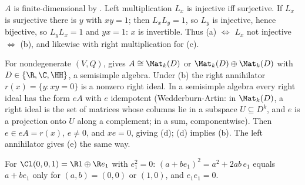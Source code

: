 $A$ is finite-dimensional by . Left multiplication $L_x$ is injective iff surjective. If $L_x$ is surjective there is $y$ with $xy = 1$; then $L_x L_y = 1$, so $L_y$ is injective, hence bijective, so $L_y L_x = 1$ and $yx = 1$: $x$ is invertible. Thus (a) $\Leftrightarrow$ $L_x$ not injective $\Leftrightarrow$ (b), and likewise with right multiplication for (c).

For nondegenerate $(V, Q)$,  gives $A \cong \Mat_k(D)$ or $\Mat_k(D) \oplus \Mat_k(D)$ with $D \in \{\R, \C, \HH\}$, a semisimple algebra. Under (b) the right annihilator $r(x) = \{y : xy = 0\}$ is a nonzero right ideal. In a semisimple algebra every right ideal has the form $eA$ with $e$ idempotent (Wedderburn-Artin: in $\Mat_k(D)$, a right ideal is the set of matrices whose columns lie in a subspace $U \subseteq D^{k}$, and $e$ is a projection onto $U$ along a complement; in a sum, componentwise). Then $e \in eA = r(x)$, $e \ne 0$, and $xe = 0$, giving (d); (d) implies (b). The left annihilator gives (e) the same way.

For $\Cl(0,0,1) = \R 1 \oplus \R e_1$ with $e_1^{2} = 0$: $(a + b e_1)^{2} = a^{2} + 2ab\, e_1$ equals $a + b e_1$ only for $(a, b) = (0, 0)$ or $(1, 0)$, and $e_1 e_1 = 0$.
